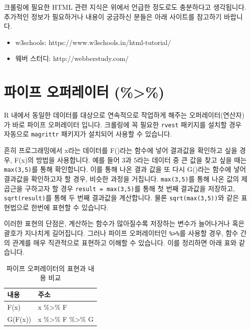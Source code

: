 \documentclass[]{book}
\providecommand{\tightlist}{%
  \setlength{\itemsep}{0pt}\setlength{\parskip}{0pt}}
\begin{document}
크롤링에 필요한 HTML 관련 지식은 위에서 언급한 정도로도 충분하다고 생각됩니다. 추가적인 정보가 필요하거나 내용이 궁금하신 분들은 아래 사이트를 참고하기 바랍니다.

\begin{itemize}
\tightlist
\item
  w3schools: https://www.w3schools.in/html-tutorial/
\item
  웨버 스터디: http://webberstudy.com/
\end{itemize}

\hypertarget{section-8}{%
\section{파이프 오퍼레이터 (\%\textgreater{}\%)}\label{section-8}}

R 내에서 동일한 데이터를 대상으로 연속적으로 작업하게 해주는 오퍼레이터(연산자)가 바로 파이프 오퍼레이터 입니다. 크롤링에 꼭 필요한 \texttt{rvest} 패키지를 설치할 경우 자동으로 \texttt{magrittr} 패키지가 설치되어 사용할 수 있습니다.

흔히 프로그래밍에서 x라는 데이터를 F()라는 함수에 넣어 결과값을 확인하고 싶을 경우, F(x)의 방법을 사용합니다. 예를 들어 3과 5라는 데이터 중 큰 값을 찾고 싶을 때는 \texttt{max(3,5)}를 통해 확인합니다. 이를 통해 나온 결과 값을 또 다시 G()라는 함수에 넣어 결과값을 확인하고자 할 경우, 비슷한 과정을 거칩니다. \texttt{max(3,5)}를 통해 나온 값의 제곱근을 구하고자 할 경우 \texttt{result\ =\ max(3,5)}를 통해 첫 번째 결과값을 저장하고, \texttt{sqrt(result)}를 통해 두 번째 결과값을 계산합니다. 물론 \texttt{sqrt(max(3,5))}와 같은 표현법으로 한번에 표현할 수 있습니다.

이러한 표현의 단점은, 계산하는 함수가 많아질수록 저장하는 변수가 늘어나거나 혹은 괄호가 지나치게 길어집니다. 그러나 파이프 오퍼레이터인 \texttt{\%\textgreater{}\%}를 사용할 경우, 함수 간의 관계를 매우 직관적으로 표현하고 이해할 수 있습니다. 이를 정리하면 아래 표와 같습니다.

\begin{table}[t]

\caption{\label{tab:unnamed-chunk-27}파이프 오퍼레이터의 표현과 내용 비교}
\centering
\begin{tabular}{ll}
\toprule
내용 & 주소\\
\midrule
F(x) & x \%>\% F\\
G(F(x)) & x \%>\% F \%>\% G\\
\bottomrule
\end{tabular}
\end{table}
\end{document}
